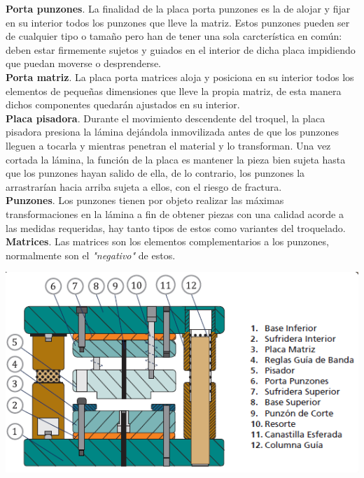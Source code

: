 \textbf{Porta punzones}. La finalidad de la placa porta punzones es la de alojar y fijar en 
su interior todos los punzones que lleve la matriz. Estos punzones pueden ser de cualquier 
tipo o tamaño pero han de tener una sola carcterística en común: deben estar firmemente 
sujetos y guiados en el interior de dicha placa impidiendo que puedan moverse o desprenderse.\\

\textbf{Porta matriz}. La placa porta matrices aloja y posiciona en su interior todos 
los elementos de pequeñas dimensiones que lleve la propia matriz, de esta manera dichos componentes 
quedarán ajustados en su interior.\\

\textbf{Placa pisadora}. Durante el movimiento descendente del troquel, la placa pisadora presiona 
la lámina dejándola inmovilizada antes de que los punzones lleguen a tocarla y mientras penetran 
el material y lo transforman. Una vez cortada la lámina, la función de la placa es mantener la 
pieza bien sujeta hasta que los punzones hayan salido de ella, de lo contrario, los punzones 
la arrastrarían hacia arriba sujeta a ellos, con el riesgo de fractura.\\

\textbf{Punzones}. Los punzones tienen por objeto realizar las máximas transformaciones en la lámina 
a fin de obtener piezas con una calidad acorde a las medidas requeridas, hay tanto tipos de estos 
como variantes del troquelado.\\

\textbf{Matrices}. Las matrices son los elementos complementarios a los punzones, normalmente 
son el \textit{"negativo"} de estos. 


\begin{center}
\includegraphics[scale=0.8]{src/ch2/componentes_troquel.png}
\label{fig:componentes_troquel}
\end{center}



